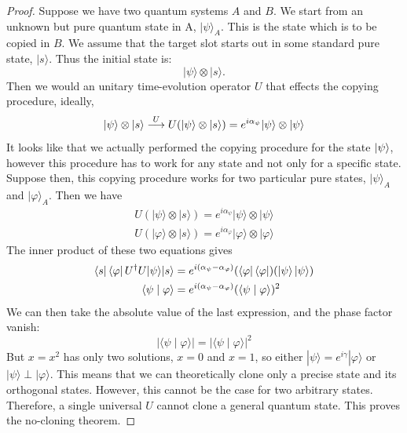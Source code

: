 \begin{proof}
Suppose we have two quantum systems $A$ and $B$.
We start from an unknown but pure quantum state in 
A, $|\psi\rangle_A$. This is the state which is to be copied in $B$. We assume that the target slot starts out in some standard pure state, $|s\rangle$. Thus the initial state is:
$$
|\psi\rangle \otimes|s\rangle .
$$
Then we would an unitary time-evolution operator $U$ that effects the copying procedure, ideally,
$$
\ket{\psi}\otimes|s\rangle \stackrel{U}{\longrightarrow} U(|\psi\rangle \otimes|s\rangle)=e^{i\alpha_{\psi}}|\psi\rangle \otimes|\psi\rangle
$$
It looks like that we actually performed the copying procedure for the state $\ket{\psi}$, however this procedure has to work for any state and not only for a specific state. 
Suppose then, this copying procedure works for two particular pure states, $|\psi\rangle_A$ and $|\varphi\rangle_A$. Then we have
$$
\begin{array}{c}
U(|\psi\rangle \otimes|s\rangle)=e^{i\alpha_{\psi}}|\psi\rangle \otimes|\psi\rangle \\
U(|\varphi\rangle \otimes|s\rangle)=e^{i\alpha_{\varphi}}|\varphi\rangle \otimes|\varphi\rangle
\end{array}
$$
The inner product of these two equations gives
\begin{align*}
    \bra{s}\bra{\varphi}U^{\dagger}U|\psi\rangle|s\rangle &= e^{i(\alpha_{\psi} -\alpha_{\varphi})}(\bra{\varphi}\bra{\varphi})(\ket{\psi}\ket{\psi})
    \\
    \langle\psi \mid \varphi\rangle&= e^{i(\alpha_{\psi} -\alpha_{\varphi})}(\langle\psi \mid \varphi\rangle)^{2}
\end{align*}
We can then take the absolute value of the last expression, and the phase factor vanish: 
\begin{equation*}
     |\langle \psi \mid \varphi\rangle|=|\langle\psi \mid \varphi\rangle|^{2}
\end{equation*}
But $x=x^{2}$ has only two solutions, $x=0$ and $x=1$, so either $|\psi\rangle=e^{i\gamma}|\varphi\rangle$ or $|\psi\rangle \perp |\varphi\rangle$. This means that we can theoretically clone only a precise state and its orthogonal states. However, this cannot be the case for two arbitrary states. Therefore, a single universal $U$ cannot clone a general quantum state. This proves the no-cloning theorem. 
\end{proof}


